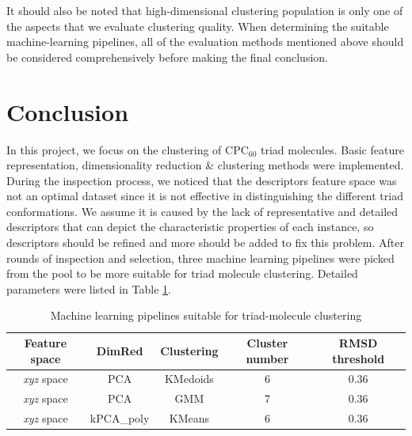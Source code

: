 \documentclass[a4paper]{article}
\begin{document}
It should also be noted that high-dimensional clustering population is only one of the aspects that we evaluate clustering quality. When determining the suitable machine-learning pipelines, all of the evaluation methods mentioned above should be considered comprehensively before making the final conclusion.

\pagebreak

\section{Conclusion}

In this project, we focus on the clustering of \(\text{CPC}_{60}\) triad molecules. Basic feature representation, dimensionality reduction \& clustering methods were implemented. During the inspection process, we noticed that the descriptors feature space was not an optimal dataset since it is not effective in distinguishing the different triad conformations. We assume it is caused by the lack of representative and detailed descriptors that can depict the characteristic properties of each instance, so descriptors should be refined and more should be added to fix this problem. After rounds of inspection and selection, three machine learning pipelines were picked from the pool to be more suitable for triad molecule clustering. Detailed parameters were listed in Table \ref{tab: final results}.

\begin{table}[H]
    \centering
    \caption{Machine learning pipelines suitable for triad-molecule clustering}
    \begin{tabular}{c|c|c|c|c}
    \hline \hline
        \textbf{Feature space} & \textbf{DimRed} & \textbf{Clustering} & \textbf{Cluster number} & \textbf{RMSD threshold} \\
        \hline
        \textit{xyz} space & PCA & KMedoids & 6 & 0.36 \\
        \textit{xyz} space & PCA & GMM & 7 & 0.36 \\
        \textit{xyz} space & kPCA\_poly & KMeans & 6 & 0.36 \\
        \hline \hline
    \end{tabular}
    \label{tab: final results}
\end{table}
\end{document}
